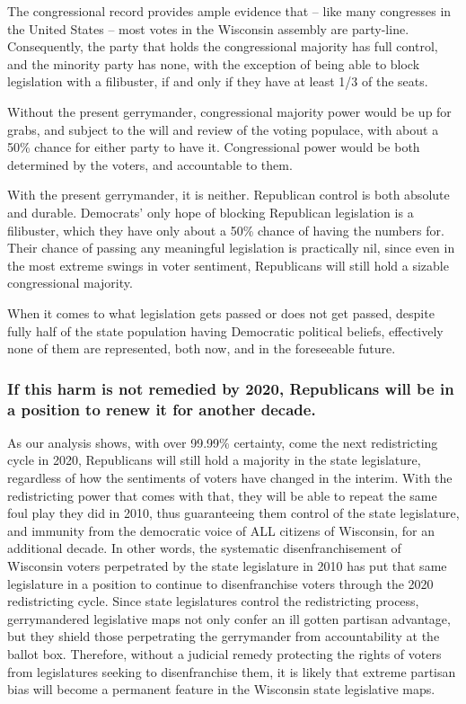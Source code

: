 \documentclass[preprint,12pt]{article}
\begin{document}
The congressional record provides ample evidence that -- like many congresses in the United States -- most votes in the Wisconsin assembly are party-line.  Consequently, the party that holds the congressional majority has full control, and the minority party has none, with the exception of being able to block legislation with a filibuster, if and only if they have at least 1/3 of the seats.
 
Without the present gerrymander, congressional majority power would be up for grabs, and subject to the will and review of the voting populace, with about a 50\% chance for either party to have it.  Congressional power would be both determined by the voters, and accountable to them.
 
With the present gerrymander, it is neither.  Republican control is both absolute and durable.  Democrats' only hope of blocking Republican legislation is a filibuster, which they have only about a 50\% chance of having the numbers for.  Their chance of passing any meaningful legislation is practically nil, since even in the most extreme swings in voter sentiment, Republicans will still hold a sizable congressional majority.
 
When it comes to what legislation gets passed or does not get passed, despite fully half of the state population having Democratic political beliefs, effectively none of them are represented, both now, and in the foreseeable future.  
 
\subsubsection{If this harm is not remedied by 2020, Republicans will be in a position to renew it for another decade.}
 
As our analysis shows, with over 99.99\% certainty, come the next redistricting cycle in 2020, Republicans will still hold a majority in the state legislature, regardless of how the sentiments of voters have changed in the interim.  With the redistricting power that comes with that, they will be able to repeat the same foul play they did in 2010, thus guaranteeing them control of the state legislature, and immunity from the democratic voice of ALL citizens of Wisconsin, for an additional decade. In other words, the systematic disenfranchisement of Wisconsin voters perpetrated by the state legislature in 2010 has put that same legislature in a position to continue to disenfranchise voters through the 2020 redistricting cycle. Since state legislatures control the redistricting process, gerrymandered legislative maps not only confer an ill gotten partisan advantage, but they shield those perpetrating the gerrymander from accountability at the ballot box. Therefore, without a judicial remedy protecting the rights of voters from legislatures seeking to disenfranchise them, it is likely that extreme partisan bias will become a permanent feature in the Wisconsin state legislative maps.
\end{document}
